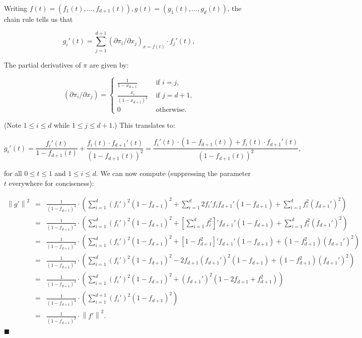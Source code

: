 \documentclass[11pt]{article}%
\newenvironment{proof}{\vspace{1ex}\noindent{\bf Proof.}}{\hspace*{\fill}$\blacksquare$\vspace{1ex}}
\newcommand{\norm}[1]{\ensuremath{\left\|#1\right\|}}
\begin{document}
\begin{proof}
Writing $f(t)=\left(f_1(t),\dots,f_{d+1}(t)\right), g(t)=\left(g_1(t),\dots,g_d(t)\right)$, the 
chain rule tells us that

$$ g_i'(t) = \sum_{j=1}^{d+1} \left(\partial \pi_i/\partial x_j\right)_{x=f(t)} \cdot f_j'(t), $$

\noindent
The partial derivatives of $\pi$ are given by:

$$ \left(\partial \pi_i/\partial x_j\right) = \begin{cases}
                                               \displaystyle \frac{1}{1-x_{d+1}} & \text{ if $i=j$, } \\[2ex]
                                               \displaystyle \frac{x_i}{(1-x_{d+1})^2} & \text{ if $j=d+1$,} \\[2ex]
                                               0 & \text{ otherwise. }
                                            \end{cases} $$
                                     
\noindent 
(Note $1\leq i \leq d$ while $1\leq j \leq d+1$.)
This translates to:

$$ g_i'(t) = \frac{f_i'(t)}{1-f_{d+1}(t)} + 
\frac{f_i(t) \cdot f_{d+1}'(t)}{\left(1-f_{d+1}(t)\right)^2} 
= 
\frac{f_i'(t) \cdot (1-f_{d+1}(t)) + f_i(t) \cdot f_{d+1}'(t)}{\left(1-f_{d+1}(t)\right)^2},
$$

\noindent
for all $0\leq t \leq 1$ and $1\leq i \leq d$.
We can now compute (suppressing the parameter $t$ everywhere for conciseness):

$$ \begin{array}{rcl}
    \norm{g'}^2 
    & = & 
    \frac{1}{\left(1-f_{d+1}\right)^4} \cdot \left( \sum_{i=1}^d (f_i')^2(1-f_{d+1})^2
    + \sum_{i=1}^d 2 f_i' f_i f_{d+1}' (1-f_{d+1}) 
    + \sum_{i=1}^d f_i^2 (f_{d+1}')^2 \right) \\
    & = & 
    \frac{1}{\left(1-f_{d+1}\right)^4} \cdot \left( \sum_{i=1}^d (f_i')^2(1-f_{d+1})^2
    + \left[ \sum_{i=1}^d f_i^2 \right]' f_{d+1}' (1-f_{d+1}) 
    + \sum_{i=1}^d f_i^2 (f_{d+1}')^2 \right) \\
    & = &
    \frac{1}{\left(1-f_{d+1}\right)^4} \cdot \left( \sum_{i=1}^d (f_i')^2(1-f_{d+1})^2
    + \left[ 1-f_{d+1}^2 \right]' f_{d+1}' (1-f_{d+1}) 
    + (1-f_{d+1}^2) (f_{d+1}')^2 \right) \\
    & = & 
    \frac{1}{\left(1-f_{d+1}\right)^4} \cdot \left( \sum_{i=1}^d (f_i')^2(1-f_{d+1})^2
    - 2 f_{d+1} (f_{d+1}')^2 (1-f_{d+1}) 
    + (1-f_{d+1}^2) (f_{d+1}')^2 \right) \\
    & = & 
    \frac{1}{\left(1-f_{d+1}\right)^4} \cdot \left( \sum_{i=1}^d (f_i')^2(1-f_{d+1})^2
    + (f_{d+1}')^2 (1-2f_{d+1} + f_{d+1}^2) \right) \\
    & = & \frac{1}{\left(1-f_{d+1}\right)^4} \cdot \left( \sum_{i=1}^{d+1} (f_i')^2(1-f_{d+1})^2
    \right) \\
    & = & \frac{1}{\left(1-f_{d+1}\right)^2} \cdot \norm{f'}^2.
   \end{array}
$$
\end{proof}
\end{document}
